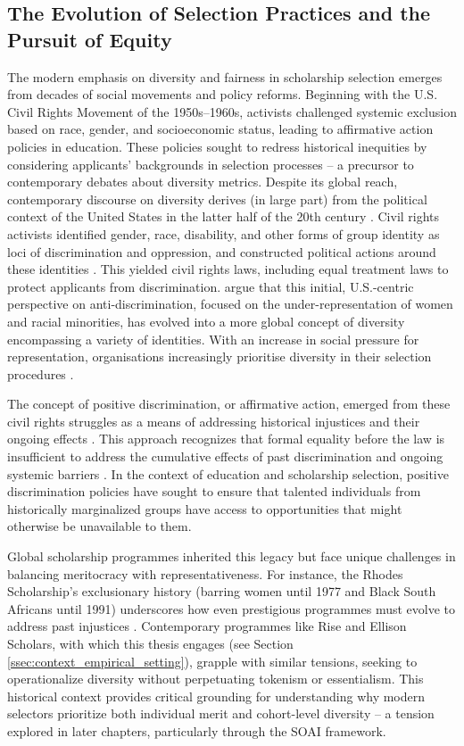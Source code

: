 \subsection{The Evolution of Selection Practices and the Pursuit of Equity}\label{ssec:context_evolution_equity}
The modern emphasis on diversity and fairness in scholarship selection emerges from decades of social movements and policy reforms. Beginning with the U.S. Civil Rights Movement of the 1950s–1960s, activists challenged systemic exclusion based on race, gender, and socioeconomic status, leading to affirmative action policies in education. These policies sought to redress historical inequities by considering applicants' backgrounds in selection processes – a precursor to contemporary debates about diversity metrics. Despite its global reach, contemporary discourse on diversity derives (in large part) from the political context of the United States in the latter half of the 20th century \cite{nkomo2019diversity}. Civil rights activists identified gender, race, disability, and other forms of group identity as loci of discrimination and oppression, and constructed political actions around these identities \cite{morris1984origins}. This yielded civil rights laws, including equal treatment laws to protect applicants from discrimination. \textcite{nkomo2019diversity} argue that this initial, U.S.-centric perspective on anti-discrimination, focused on the under-representation of women and racial minorities, has evolved into a more global concept of diversity encompassing a variety of identities. With an increase in social pressure for representation, organisations increasingly prioritise diversity in their selection procedures \cite{hsieh2019allocation,minkin2023diversity}.

The concept of positive discrimination, or affirmative action, emerged from these civil rights struggles as a means of addressing historical injustices and their ongoing effects \cite{anderson2010imperative,young1990justice}. This approach recognizes that formal equality before the law is insufficient to address the cumulative effects of past discrimination and ongoing systemic barriers \cite{anderson2010imperative}. In the context of education and scholarship selection, positive discrimination policies have sought to ensure that talented individuals from historically marginalized groups have access to opportunities that might otherwise be unavailable to them.

Global scholarship programmes inherited this legacy but face unique challenges in balancing meritocracy with representativeness. For instance, the Rhodes Scholarship's exclusionary history (barring women until 1977 and Black South Africans until 1991) underscores how even prestigious programmes must evolve to address past injustices \cite{Ziegler_2008}. Contemporary programmes like Rise and Ellison Scholars, with which this thesis engages (see Section \ref{ssec:context_empirical_setting}), grapple with similar tensions, seeking to operationalize diversity without perpetuating tokenism or essentialism. This historical context provides critical grounding for understanding why modern selectors prioritize both individual merit and cohort-level diversity – a tension explored in later chapters, particularly through the SOAI framework.

